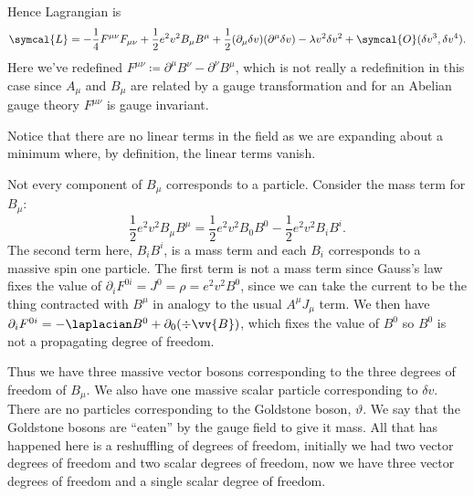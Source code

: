 \documentclass[fleqn]{NotesClass}
\newcommand{\order}{\symcal{O}}
\newcommand{\lagrangianDensity}{\symcal{L}}
\begin{document}
    Hence Lagrangian is
    \begin{equation}
        \lagrangianDensity = -\frac{1}{4}F^{\mu\nu}F_{\mu\nu} + \frac{1}{2}e^2v^2 B_\mu B^\mu + \frac{1}{2}(\partial_\mu \delta v)(\partial^\mu \delta v) - \lambda v^2 \delta v^2 + \order(\delta v^3, \delta v^4).
    \end{equation}
    Here we've redefined \(F^{\mu\nu} \coloneqq \partial^\mu B^\nu - \partial^\nu B^\mu\), which is not really a redefinition in this case since \(A_\mu\) and \(B_\mu\) are related by a gauge transformation and for an Abelian gauge theory \(F^{\mu\nu}\) is gauge invariant.
    
    Notice that there are no linear terms in the field as we are expanding about a minimum where, by definition, the linear terms vanish.
    
    Not every component of \(B_\mu\) corresponds to a particle.
    Consider the mass term for \(B_\mu\):
    \begin{equation}
        \frac{1}{2}e^2 v^2 B_\mu B^\mu = \frac{1}{2}e^2 v^2 B_0 B^0 - \frac{1}{2} e^2 v^2 B_i B^i.
    \end{equation}
    The second term here, \(B_i B^i\), is a mass term and each \(B_i\) corresponds to a massive spin one particle.
    The first term is not a mass term since Gauss's law fixes the value of \(\partial_i F^{0i} = J^0 = \rho = e^2 v^2 B^0\), since we can take the current to be the thing contracted with \(B^\mu\) in analogy to the usual \(A^\mu J_\mu\) term.
    We then have \(\partial_i F^{0i} = -\laplacian B^0 + \partial_0(\div \vv{B})\), which fixes the value of \(B^0\) so \(B^0\) is not a propagating degree of freedom.
    
    Thus we have three massive vector bosons corresponding to the three degrees of freedom of \(B_\mu\).
    We also have one massive scalar particle corresponding to \(\delta v\).
    There are no particles corresponding to the Goldstone boson, \(\vartheta\).
    We say that the Goldstone bosons are \enquote{eaten} by the gauge field to give it mass.
    All that has happened here is a reshuffling of degrees of freedom, initially we had two vector degrees of freedom and two scalar degrees of freedom, now we have three vector degrees of freedom and a single scalar degree of freedom.
    
\end{document}
